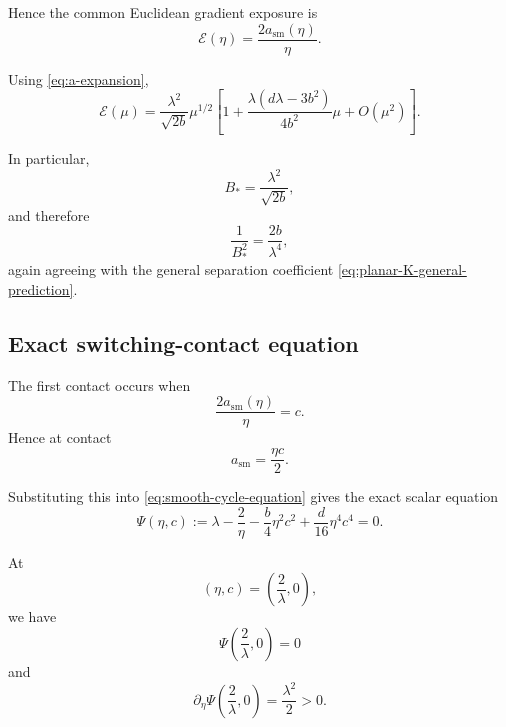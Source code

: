 Hence the common Euclidean gradient exposure is
\begin{equation}
\boxed{
\mathscr E(\eta)
=
\frac{2a_{\mathrm{sm}}(\eta)}{\eta}.
}
\label{eq:planar-exposure-exact}
\end{equation}

Using \eqref{eq:a-expansion},
\begin{equation}
\mathscr E(\mu)
=
\frac{\lambda^2}{\sqrt{2b}}
\mu^{1/2}
\left[
1
+
\frac{
\lambda(d\lambda-3b^2)
}{
4b^2
}
\mu
+
O(\mu^2)
\right].
\label{eq:planar-exposure-expansion}
\end{equation}

In particular,
\begin{equation}
B_*
=
\frac{\lambda^2}{\sqrt{2b}},
\label{eq:planar-B}
\end{equation}
and therefore
\begin{equation}
\frac{1}{B_*^2}
=
\frac{2b}{\lambda^4},
\label{eq:planar-B-inverse}
\end{equation}
again agreeing with the general separation coefficient
\eqref{eq:planar-K-general-prediction}.

\subsection{Exact switching-contact equation}
\label{subsec:planar-contact-equation}

The first contact occurs when
\begin{equation}
\frac{2a_{\mathrm{sm}}(\eta)}{\eta}
=
c.
\label{eq:planar-contact-condition}
\end{equation}
Hence at contact
\begin{equation}
a_{\mathrm{sm}}
=
\frac{\eta c}{2}.
\label{eq:planar-contact-amplitude}
\end{equation}

Substituting this into
\eqref{eq:smooth-cycle-equation} gives the exact scalar equation
\begin{equation}
\Psi(\eta,c)
:=
\lambda
-
\frac{2}{\eta}
-
\frac{b}{4}\eta^2c^2
+
\frac{d}{16}\eta^4c^4
=
0.
\label{eq:Psi-contact}
\end{equation}

At
\[
(\eta,c)
=
\left(
\frac{2}{\lambda},0
\right),
\]
we have
\[
\Psi\left(\frac{2}{\lambda},0\right)=0
\]
and
\begin{equation}
\partial_\eta\Psi
\left(
\frac{2}{\lambda},0
\right)
=
\frac{\lambda^2}{2}
>0.
\label{eq:Psi-eta-positive}
\end{equation}

